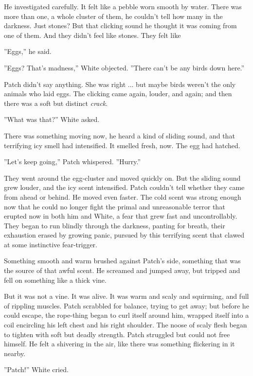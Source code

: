 \documentclass[11pt]{article}
\begin{document}
 He investigated carefully. It felt like a pebble worn smooth by water. There was more than one, a whole cluster of them, he couldn't tell how many in the darkness. Just stones? But that clicking sound %
 he thought it was coming from one of them. And they didn't feel like stones. They felt like %
\par
 ''Eggs,'' he said.\par
 ''Eggs? That's madness,'' White objected. ''There can't be any birds down here.''\par
 Patch didn't say anything. She was right ... but maybe birds weren't the only animals who laid eggs. The clicking came again, louder, and again; and then there was a soft but distinct {\it crack}.\par
 ''What was that?'' White asked.\par
 There was something moving now, he heard a kind of sliding sound, and that terrifying icy smell had intensified. It smelled fresh, now. The egg had hatched.\par
 ''Let's keep going,'' Patch whispered. ''Hurry.''\par
 They went around the egg-cluster and moved quickly on. But the sliding sound grew louder, and the icy scent intensified. Patch couldn't tell whether they came from ahead or behind. He moved even faster. The cold scent was strong enough now that he could no longer fight the primal and unreasonable terror that erupted now in both him and White, a fear that grew fast and uncontrollably. They began to run blindly through the darkness, panting for breath, their exhaustion erased by growing panic, pursued by this terrifying scent that clawed at some instinctive fear-trigger.\par
 Something smooth and warm brushed against Patch's side, something that was the source of that awful scent. He screamed and jumped away, but tripped and fell on something like a thick vine.\par
But it was not a vine. It was alive. It was warm and scaly and squirming, and full of rippling muscles. Patch scrabbled for balance, trying to get away; but before he could escape, the rope-thing began to curl itself around him, wrapped itself into a coil encircling his left chest and his right shoulder. The noose of scaly flesh began to tighten with soft but deadly strength. Patch struggled but could not free himself. He felt a shivering in the air, like there was something flickering in it nearby.\par
 ''Patch!'' White cried.\par
\end{document}
